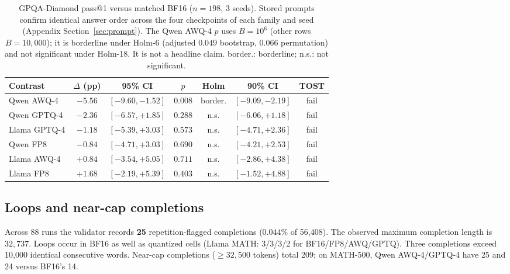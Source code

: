 \documentclass[11pt,a4paper]{article}
\begin{document}
\begin{table}[t]
\centering
\caption{GPQA-Diamond pass@1 versus matched BF16 ($n=198$, 3 seeds). Stored prompts confirm identical answer order across the four checkpoints of each family and seed (Appendix Section~\ref{sec:prompt}). The Qwen AWQ-4 $p$ uses $B=10^6$ (other rows $B=10{,}000$); it is borderline under Holm-6 (adjusted $0.049$ bootstrap, $0.066$ permutation) and not significant under Holm-18. It is not a headline claim. border.: borderline; n.s.: not significant.}
\label{tab:gpqa-contrasts}
\small
\begin{tabular}{lcccccc}
\toprule
\textbf{Contrast} & $\Delta$ (pp) & \textbf{95\% CI} & $p$ & \textbf{Holm} & \textbf{90\% CI} & \textbf{TOST} \\
\midrule
Qwen AWQ-4   & $-5.56$ & $[-9.60,-1.52]$ & $0.008$ & border. & $[-9.09,-2.19]$ & fail \\
Qwen GPTQ-4  & $-2.36$ & $[-6.57,+1.85]$ & $0.288$ & n.s. & $[-6.06,+1.18]$ & fail \\
Llama GPTQ-4 & $-1.18$ & $[-5.39,+3.03]$ & $0.573$ & n.s. & $[-4.71,+2.36]$ & fail \\
Qwen FP8     & $-0.84$ & $[-4.71,+3.03]$ & $0.690$ & n.s. & $[-4.21,+2.53]$ & fail \\
Llama AWQ-4  & $+0.84$ & $[-3.54,+5.05]$ & $0.711$ & n.s. & $[-2.86,+4.38]$ & fail \\
Llama FP8    & $+1.68$ & $[-2.19,+5.39]$ & $0.403$ & n.s. & $[-1.52,+4.88]$ & fail \\
\bottomrule
\end{tabular}
\end{table}

\subsection{Loops and near-cap completions}
\label{sec:pathology}
Across 88 runs the validator records \textbf{25} repetition-flagged completions ($0.044\%$ of 56{,}408). The observed maximum completion length is $32{,}737$. Loops occur in BF16 as well as quantized cells (Llama MATH: 3/3/3/2 for BF16/FP8/AWQ/GPTQ). Three completions exceed 10{,}000 identical consecutive words. Near-cap completions ($\ge 32{,}500$ tokens) total 209; on MATH-500, Qwen AWQ-4/GPTQ-4 have 25 and 24 versus BF16's 14.
\end{document}
